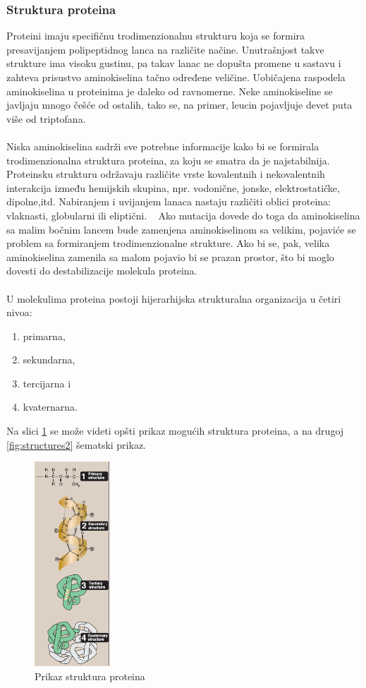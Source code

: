 \documentclass[a4paper]{article}
\begin{document}
\subsubsection{Struktura proteina}
Proteini imaju specifičnu trodimenzionalnu strukturu koja se formira presavijanjem polipeptidnog lanca na različite načine. Unutrašnjost takve strukture ima visoku gustinu, pa takav lanac ne dopušta promene u sastavu i zahteva prisustvo aminokiselina tačno određene veličine.
Uobičajena raspodela aminokiselina u proteinima je daleko od ravnomerne. Neke aminokiseline se javljaju mnogo češće od ostalih, tako se, na primer, leucin pojavljuje devet puta više od triptofana. \\\\
Niska aminokiselina sadrži sve potrebne informacije kako bi se formirala trodimenzionalna struktura proteina, za koju se smatra da je najstabilnija. Proteinsku strukturu održavaju različite vrste kovalentnih i nekovalentnih interakcija između hemijskih skupina, npr. vodonične, jonske, elektrostatičke, dipolne,itd. Nabiranjem i uvijanjem lanaca nastaju različiti oblici proteina: vlaknasti, globularni ili eliptični. ~\cite{medbio}
Ako mutacija dovede do toga da aminokiselina sa malim bočnim lancem bude zamenjena aminokiselinom sa velikim, pojaviće se problem sa formiranjem trodimenzionalne strukture. Ako bi se, pak, velika aminokiselina zamenila sa malom pojavio bi se prazan prostor, što bi moglo dovesti do destabilizacije molekula proteina. \\\\
U molekulima proteina postoji hijerarhijska strukturalna organizacija u četiri nivoa:
\begin{enumerate}
\item primarna,
\item sekundarna,
\item tercijarna i
\item kvaternarna.~\cite{spasic}
\end{enumerate}
Na slici \ref{fig:structures} se može videti opšti prikaz mogućih struktura proteina, a na drugoj \ref{fig:structures2} šematski prikaz.
\begin{figure}[h]
	\centering
    \includegraphics[width=0.25\textwidth]{Pictures/protein_structures.png}
    \caption{Prikaz struktura proteina~\cite{lippincott}}
    \label{fig:structures}
\end{figure}
\end{document}
